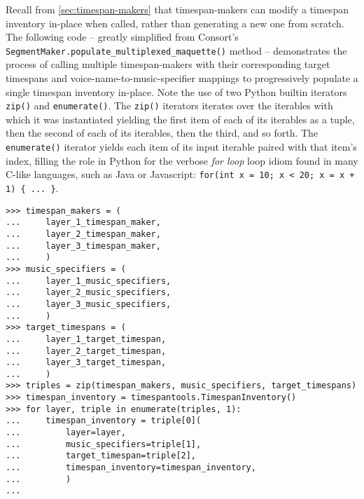 \noindent Recall from \autoref{sec:timespan-makers} that timespan-makers can
modify a timespan inventory in-place when called, rather than generating a new
one from scratch. The following code -- greatly simplified from Consort's
\texttt{SegmentMaker.populate\_multiplexed\_maquette()} method -- demonstrates
the process of calling multiple timespan-makers with their corresponding target
timespans and voice-name-to-music-specifier mappings to progressively populate
a single timespan inventory in-place. Note the use of two Python builtin
iterators \texttt{zip()} and \texttt{enumerate()}. The \texttt{zip()} iterators
iterates over the iterables with which it was instantiated yielding the first
item of each of its iterables as a tuple, then the second of each of its
iterables, then the third, and so forth. The \texttt{enumerate()} iterator
yields each item of its input iterable paired with that item's index, filling
the role in Python for the verbose \emph{for loop} loop idiom found in many
C-like languages, such as Java or Javascript: \texttt{for(int x = 10; x < 20; x
= x + 1) \{ ... \}}.

\begin{comment}
<abjad>
timespan_makers = (
    layer_1_timespan_maker,
    layer_2_timespan_maker,
    layer_3_timespan_maker,
    )
music_specifiers = (
    layer_1_music_specifiers,
    layer_2_music_specifiers,
    layer_3_music_specifiers,
    )
target_timespans = (
    layer_1_target_timespan,
    layer_2_target_timespan,
    layer_3_target_timespan,
    )
triples = zip(timespan_makers, music_specifiers, target_timespans)
timespan_inventory = timespantools.TimespanInventory()
for layer, triple in enumerate(triples, 1):
    timespan_inventory = triple[0](
        layer=layer,
        music_specifiers=triple[1],
        target_timespan=triple[2],
        timespan_inventory=timespan_inventory,
        )

</abjad>
\end{comment}

\begin{abjadbookoutput}
\begin{singlespacing}
\vspace{-0.5\baselineskip}
\begin{verbatim}
>>> timespan_makers = (
...     layer_1_timespan_maker,
...     layer_2_timespan_maker,
...     layer_3_timespan_maker,
...     )
>>> music_specifiers = (
...     layer_1_music_specifiers,
...     layer_2_music_specifiers,
...     layer_3_music_specifiers,
...     )
>>> target_timespans = (
...     layer_1_target_timespan,
...     layer_2_target_timespan,
...     layer_3_target_timespan,
...     )
>>> triples = zip(timespan_makers, music_specifiers, target_timespans)
>>> timespan_inventory = timespantools.TimespanInventory()
>>> for layer, triple in enumerate(triples, 1):
...     timespan_inventory = triple[0](
...         layer=layer,
...         music_specifiers=triple[1],
...         target_timespan=triple[2],
...         timespan_inventory=timespan_inventory,
...         )
...
\end{verbatim}
\end{singlespacing}
\end{abjadbookoutput}

